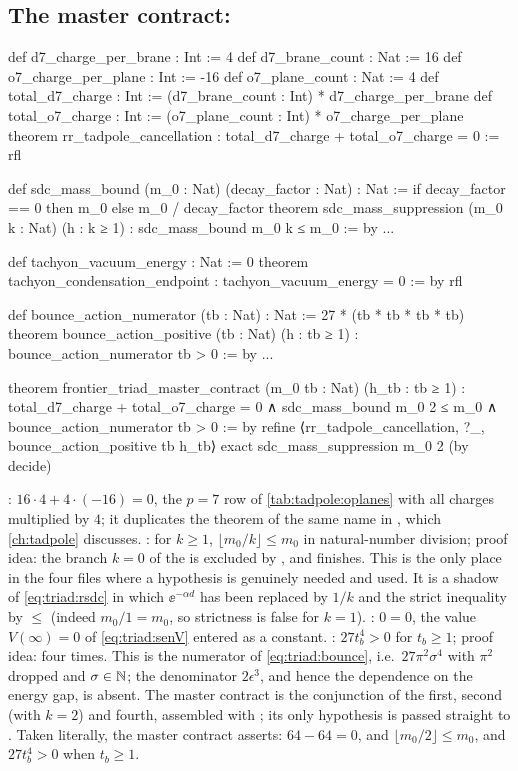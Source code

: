 \subsection{The master contract: }

\begin{leancode}
def d7_charge_per_brane : Int := 4
def d7_brane_count : Nat := 16
def o7_charge_per_plane : Int := -16
def o7_plane_count : Nat := 4
def total_d7_charge : Int := (d7_brane_count : Int) * d7_charge_per_brane
def total_o7_charge : Int := (o7_plane_count : Int) * o7_charge_per_plane
theorem rr_tadpole_cancellation :
    total_d7_charge + total_o7_charge = 0 := rfl

def sdc_mass_bound (m_0 : Nat) (decay_factor : Nat) : Nat :=
  if decay_factor == 0 then m_0 else m_0 / decay_factor
theorem sdc_mass_suppression (m_0 k : Nat) (h : k ≥ 1) :
    sdc_mass_bound m_0 k ≤ m_0 := by ...

def tachyon_vacuum_energy : Nat := 0
theorem tachyon_condensation_endpoint :
    tachyon_vacuum_energy = 0 := by rfl

def bounce_action_numerator (tb : Nat) : Nat :=
  27 * (tb * tb * tb * tb)
theorem bounce_action_positive (tb : Nat) (h : tb ≥ 1) :
    bounce_action_numerator tb > 0 := by ...

theorem frontier_triad_master_contract (m_0 tb : Nat) (h_tb : tb ≥ 1) :
    total_d7_charge + total_o7_charge = 0 ∧
    sdc_mass_bound m_0 2 ≤ m_0 ∧
    bounce_action_numerator tb > 0 := by
  refine ⟨rr_tadpole_cancellation, ?_, bounce_action_positive tb h_tb⟩
  exact sdc_mass_suppression m_0 2 (by decide)
\end{leancode}
\begin{leanbox}
: $16\cdot4+4\cdot(-16)=0$, the $p=7$ row of
\cref{tab:tadpole:oplanes} with all charges multiplied by $4$; it duplicates the theorem of
the same name in , which \cref{ch:tadpole} discusses.
: for $k\ge1$, $\lfloor m_0/k\rfloor\le m_0$ in natural-number
division; proof idea: the branch $k=0$ of the  is excluded by , and
 finishes. This is the only place in the four files where a
hypothesis is genuinely needed and used. It is a shadow of \eqref{eq:triad:rsdc} in which
$\ee^{-\alpha d}$ has been replaced by $1/k$ and the strict inequality by $\le$ (indeed
$m_0/1=m_0$, so strictness is false for $k=1$).
: $0=0$, the value $V(\infty)=0$ of
\eqref{eq:triad:senV} entered as a constant.
: $27t_b^4>0$ for $t_b\ge1$; proof idea: 
four times. This is the numerator of \eqref{eq:triad:bounce}, i.e.\ $27\pi^2\sigma^4$ with
$\pi^2$ dropped and $\sigma\in\mathbb{N}$; the denominator $2\epsilon^3$, and hence the dependence on
the energy gap, is absent. The master contract is the conjunction of the first, second (with
$k=2$) and fourth, assembled with ; its only hypothesis
 is passed straight to . Taken literally, the
master contract asserts: $64-64=0$, and $\lfloor m_0/2\rfloor\le m_0$, and $27t_b^4>0$ when
$t_b\ge1$.
\end{leanbox}


